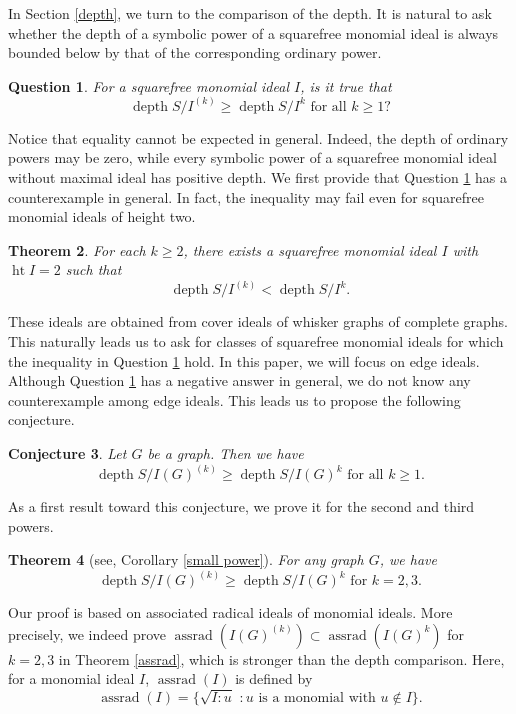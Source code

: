 \documentclass[12pt]{amsart}
\newtheorem{thm}{Theorem}[section]
\newtheorem{q}[thm]{Question}
\newtheorem{conj}[thm]{Conjecture}
\theoremstyle{definition}
\theoremstyle{remark}
\DeclareMathOperator{\depth}{depth}
\DeclareMathOperator{\height}{ht}
\DeclareMathOperator{\assrad}{assrad}
\begin{document}
In Section \ref{depth}, we turn to the comparison of the depth. It is natural to ask whether the depth of a symbolic power of a squarefree monomial ideal is always bounded below by that of the corresponding ordinary power.   
\begin{q}\label{ques of depth}
For a squarefree monomial ideal $I$, is it true that 
$$\depth S/I^{(k)}\geq\depth S/I^{k}\mbox{ for all }k\geq1 ?$$
\end{q}

Notice that equality cannot be expected in general. Indeed, the depth of ordinary powers may be zero, while every symbolic power of a squarefree monomial ideal without maximal ideal has positive depth. We first provide that Question \ref{ques of depth} has a counterexample in general. In fact, the inequality may fail even for squarefree monomial ideals of height two. 

\begin{thm}
For each $k\geq2$, there exists a squarefree monomial ideal $I$ with $\height I=2$ such that 
$$\depth S/I^{(k)}<\depth S/I^{k}.$$
\end{thm}

These ideals are obtained from cover ideals of whisker graphs of complete graphs.  This naturally leads us to ask for classes of squarefree monomial ideals for which the inequality in Question \ref{ques of depth} hold. In this paper, we will focus on edge ideals. Although Question \ref{ques of depth} has a negative answer in general, we do not know any counterexample among edge ideals. This leads us to propose the following conjecture. 

\begin{conj}\label{conj}
Let $G$ be a graph. Then we have 
$$\depth S/I(G)^{(k)}\geq\depth S/I(G)^{k}\mbox{ for all }k\geq1.$$
\end{conj}

As a first result toward this conjecture, we prove it for the second and third powers. 
\begin{thm}[see, Corollary \ref{small power}]
For any graph $G$, we have 
$$\depth S/I(G)^{(k)}\geq\depth S/I(G)^{k}\mbox{ for }k=2,3.$$   
\end{thm}

Our proof is based on associated radical ideals of monomial ideals. More precisely, we indeed prove $\assrad(I(G)^{(k)})\subset\assrad(I(G)^{k})$ for $k=2,3$ in Theorem \ref{assrad}, which is stronger than the depth comparison. Here, for a monomial ideal $I$, $\assrad(I)$ is defined by 
$$\assrad(I)=\{\sqrt{I:u}\,\,: u\mbox{ is a monomial with }u\notin I\}.$$
\end{document}
